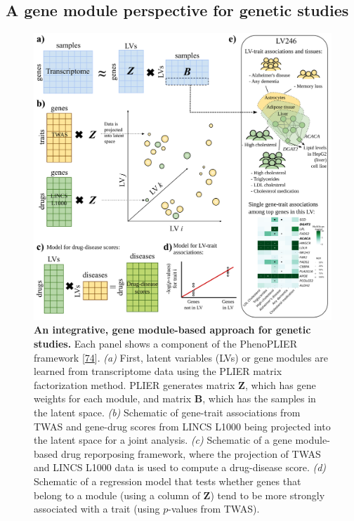 \hypertarget{a-gene-module-perspective-for-genetic-studies}{%
\subsection{A gene module perspective for genetic studies}\label{a-gene-module-perspective-for-genetic-studies}}

\begin{figure}
\hypertarget{fig:fig4}{%
\centering
\includegraphics[width=1\textwidth,height=\textheight]{images/fig4.svg}
\caption{\textbf{An integrative, gene module-based approach for genetic studies.}
Each panel shows a component of the PhenoPLIER framework {[}\protect\hyperlink{ref-NM3rHx1i}{74}{]}.
\emph{(a)} First, latent variables (LVs) or gene modules are learned from transcriptome data using the PLIER matrix factorization method.
PLIER generates matrix \(\mathbf{Z}\), which has gene weights for each module, and matrix \(\mathbf{B}\), which has the samples in the latent space.
\emph{(b)} Schematic of gene-trait associations from TWAS and gene-drug scores from LINCS L1000 being projected into the latent space for a joint analysis.
\emph{(c)} Schematic of a gene module-based drug reporposing framework, where the projection of TWAS and LINCS L1000 data is used to compute a drug-disease score.
\emph{(d)} Schematic of a regression model that tests whether genes that belong to a module (using a column of \(\mathbf{Z}\)) tend to be more strongly associated with a trait (using \(p\)-values from TWAS).
}}
\end{figure}
